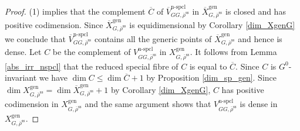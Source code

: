 \documentclass{amsart}
\theoremstyle{definition}
\theoremstyle{remark}
\newcommand{\Vbar}{\overline{{V}}}
\newcommand{\rhobar}{\overline{\rho}}
\newcommand{\gen}{\mathrm{gen}}
\newcommand{\Xbar}{\overline{X}}
\DeclareMathOperator{\nspcl}{n-spcl}
\newcommand{\rhobarss}{\rhobar^{\mathrm{ss}}}
\begin{document}
\begin{proof}   (1) implies that
the complement $\overline{C}$ of $\Vbar^{\nspcl}_{GG, \rhobarss}$ in $\Xbar^{\gen}_{G, \rhobarss}$
is closed and has positive codimension. Since $\Xbar^{\gen}_{G, \rhobarss}$ is equidimensional
by Corollary \ref{dim_XgenG} we conclude that $\Vbar^{\nspcl}_{GG, \rhobarss}$ contains 
all the generic points of $\Xbar^{\gen}_{G, \rhobarss}$ and hence is dense. 
Let $C$ be the complement of $V^{\nspcl}_{GG, \rhobarss}$ in $X^{\gen}_{G, \rhobarss}$. 
It follows from Lemma \ref{abs_irr_nspcl} 
that the reduced special fibre of $C$ is equal to $\overline{C}$. 
Since $C$ is $G^0$-invariant we have $\dim C \le \dim \overline{C}+1$ by Proposition \ref{dim_sp_gen}. 
Since $\dim X^{\gen}_{G, \rhobarss}= \dim \Xbar^{\gen}_{G, \rhobarss}+1$ by Corollary \ref{dim_XgenG}, 
$C$ has positive codimension in $X^{\gen}_{G, \rhobarss}$ and the same argument 
shows that $V^{\nspcl}_{GG, \rhobarss}$ is dense in $X^{\gen}_{G, \rhobarss}$. 
\end{proof}
\end{document}
